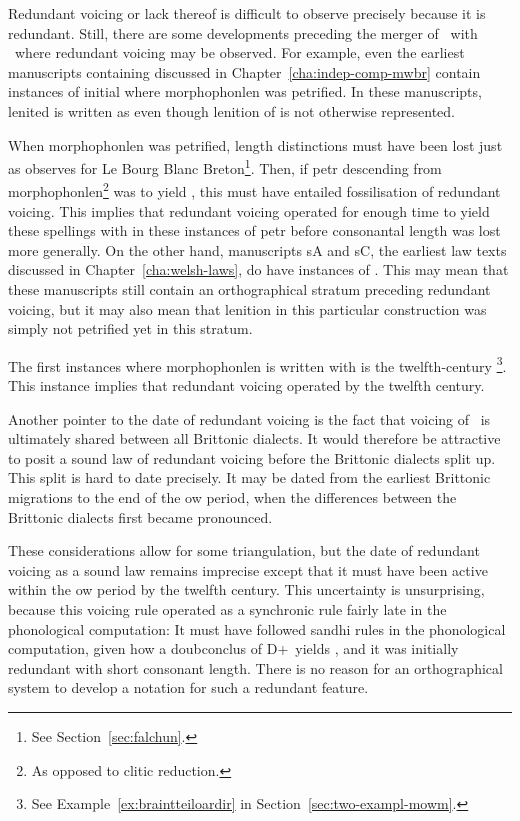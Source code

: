 Redundant voicing or lack thereof is difficult to observe precisely because it is redundant. Still, there are some developments preceding the merger of \lT\ with \xD\ where redundant voicing may be observed. For example, even the earliest manuscripts containing  discussed in Chapter~\ref{cha:indep-comp-mwbr} contain instances of initial  where \gls{morphophonlen} was petrified. In these manuscripts, lenited  is written as  even though lenition of  is not otherwise represented.

When \gls{morphophonlen} was petrified, length distinctions must have been lost just as \textcite{falchun_systeme_1951} observes for Le Bourg Blanc Breton\footnote{See Section~\ref{sec:falchun}.}. Then, if \gls{petr} descending from \gls{morphophonlen}\footnote{As opposed to clitic reduction.} was to yield , this must have entailed fossilisation of redundant voicing. This implies that redundant voicing operated for enough time to yield these spellings with  in these instances of \gls{petr} before consonantal length was lost more generally. On the other hand, manuscripts \gls{sA} and \gls{sC}, the earliest law texts discussed in Chapter~\ref{cha:welsh-laws}, do have instances of . This may mean that these manuscripts still contain an orthographical stratum preceding redundant voicing, but it may also mean that lenition in this particular construction was simply not petrified yet in this stratum.

The first instances where \gls{morphophonlen} is written with  is the twelfth-century \footnote{See Example~\ref{ex:braintteiloardir} in Section~\ref{sec:two-exampl-mowm}.}. This instance implies that redundant voicing operated by the twelfth century.

Another pointer to the date of redundant voicing is the fact that voicing of \lT\ is ultimately shared between all Brittonic dialects. It would therefore be attractive to posit a sound law of redundant voicing before the Brittonic dialects split up. This split is hard to date precisely. It may be dated from the earliest Brittonic migrations to the end of the \gls{ow} period, when the differences between the Brittonic dialects first became pronounced.

These considerations allow for some triangulation, but the date of redundant voicing as a sound law remains imprecise except that it must have been active within the \gls{ow} period  by the twelfth century. This uncertainty is  unsurprising, because this voicing rule operated as a synchronic rule fairly late in the phonological computation: It must have followed \gls{sandhi} rules in the phonological computation, given how a \gls{doubconclus} of \gls{D}+\lT\ yields \xT, and it was initially redundant with short consonant length. There is no reason for an orthographical system to develop a notation for such a redundant feature.

